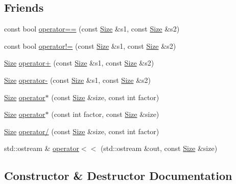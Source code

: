 \subsection*{Friends}
\begin{DoxyCompactItemize}
\item 
const bool \hyperlink{classprism_1_1_size_a0ecba9b1ddf7508ab7d47f24fccc5b2c}{operator==} (const \hyperlink{classprism_1_1_size}{Size} \&s1, const \hyperlink{classprism_1_1_size}{Size} \&s2)
\item 
const bool \hyperlink{classprism_1_1_size_a766b0bce48ef4987bde75192bc2703ee}{operator!=} (const \hyperlink{classprism_1_1_size}{Size} \&s1, const \hyperlink{classprism_1_1_size}{Size} \&s2)
\item 
\hyperlink{classprism_1_1_size}{Size} \hyperlink{classprism_1_1_size_a8a42e08734218778f68f34d79f9c8130}{operator+} (const \hyperlink{classprism_1_1_size}{Size} \&s1, const \hyperlink{classprism_1_1_size}{Size} \&s2)
\item 
\hyperlink{classprism_1_1_size}{Size} \hyperlink{classprism_1_1_size_ac19f7036b22c72ce81d89025af2510f0}{operator-\/} (const \hyperlink{classprism_1_1_size}{Size} \&s1, const \hyperlink{classprism_1_1_size}{Size} \&s2)
\item 
\hyperlink{classprism_1_1_size}{Size} \hyperlink{classprism_1_1_size_a159c2e1e3dcb9ee6c1c681533f2c0d36}{operator$\ast$} (const \hyperlink{classprism_1_1_size}{Size} \&size, const int factor)
\item 
\hyperlink{classprism_1_1_size}{Size} \hyperlink{classprism_1_1_size_a9e8c3a611d6cff45b435eb6439cf5e2e}{operator$\ast$} (const int factor, const \hyperlink{classprism_1_1_size}{Size} \&size)
\item 
\hyperlink{classprism_1_1_size}{Size} \hyperlink{classprism_1_1_size_a54c78dfe93394bb7069b0880a3183909}{operator/} (const \hyperlink{classprism_1_1_size}{Size} \&size, const int factor)
\item 
std\+::ostream \& \hyperlink{classprism_1_1_size_a8e7b189b7bed4a1acb084ff4cd0cf2a6}{operator$<$$<$} (std\+::ostream \&out, const \hyperlink{classprism_1_1_size}{Size} \&size)
\end{DoxyCompactItemize}


\subsection{Constructor \& Destructor Documentation}
